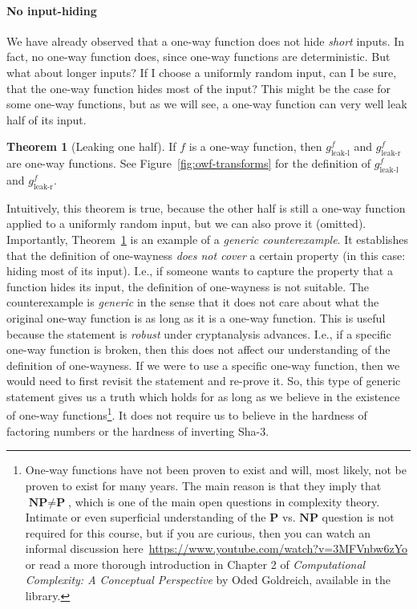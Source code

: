 \documentclass[a4paper,table,dvipsnames]{article}
\theoremstyle{definition}
\newtheorem{theorem}{Theorem}
\begin{document}
\paragraph{No input-hiding} We have already observed that a one-way function does not hide \emph{short} inputs. In fact, no one-way function does,
since one-way functions are deterministic. But what about longer inputs? If I choose a uniformly random input, can I be 
sure, that the one-way function hides most of the input? This might be the case for some one-way functions, but as we
will see, a one-way function can very well leak half of its input.
\begin{theorem}[Leaking one half]\label{thm:leakhalf}
If $f$ is a one-way function, then $g^f_{\text{leak-l}}$ and $g^f_{\text{leak-r}}$ are one-way functions. See Figure~\ref{fig:owf-transforms} for the definition of $g^f_{\text{leak-l}}$ and $g^f_{\text{leak-r}}$.
\end{theorem}
Intuitively, this theorem is true, because the other half is still a one-way function applied to a uniformly random input,
but we can also prove it (omitted). Importantly, Theorem~\ref{thm:leakhalf} is an example of a \emph{generic counterexample}. It establishes that the definition of one-wayness \emph{does not cover} a certain property (in this case: hiding most of its input). I.e., if someone wants to capture the property that a function hides its input, the definition of one-wayness is not suitable. The counterexample is \emph{generic} in the sense that it does not care about what the original one-way function is as long as it is a one-way function. This is useful because the statement is \emph{robust} under cryptanalysis advances. I.e., if a specific one-way function is broken, then this does not affect our understanding of the definition of one-wayness. If we were to use a specific one-way function, then we would need to first revisit the statement and re-prove it. So, this type of generic statement gives us a truth which holds for as long as we believe in the existence of one-way functions\footnote{One-way functions have not been proven to exist and will, most likely, not be proven to exist for many years. The main reason is that they imply that $\textbf{NP}\neq\textbf{P}$, which is one of the main open questions in complexity theory. Intimate or even superficial understanding of the $\textbf{P}$ vs. $\textbf{NP}$ question is not required for this course, but if you are curious, then you can watch an informal discussion here~\url{https://www.youtube.com/watch?v=3MFVnbw6zYo} or read a more thorough introduction in Chapter 2 of \emph{Computational Complexity: A Conceptual Perspective} by Oded Goldreich, available in the library.}. It does not require us to believe in the hardness of factoring numbers or the hardness of inverting Sha-3.
\end{document}
